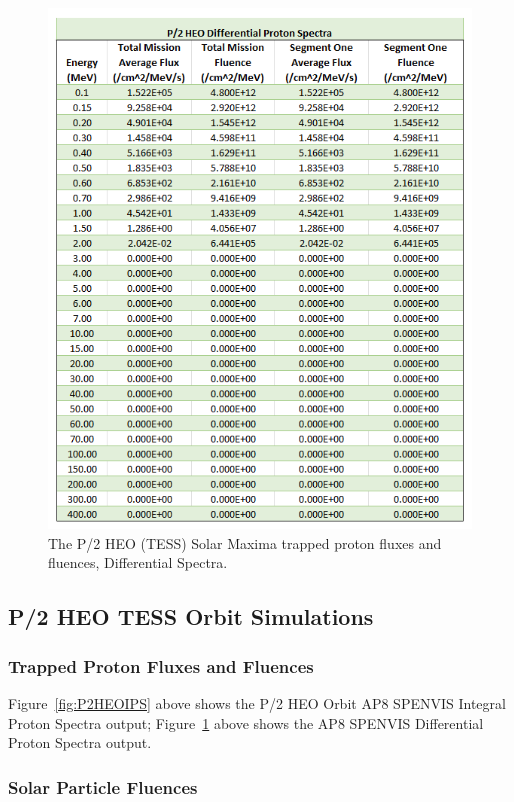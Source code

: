 \documentclass[11pt]{article}
\begin{document}
\begin{figure}[H]
\begin{minipage}{\dimexpr.5\textwidth-1em}
        \includegraphics[width=1\linewidth]{HEO_DPS.png}
        \caption{The P/2 HEO (TESS) Solar Maxima trapped proton fluxes and fluences, Differential Spectra.}
        \label{fig:P2HEODPS}
    \end{minipage}
\end{figure}

\subsection{P/2 HEO TESS Orbit Simulations}

\subsubsection{Trapped Proton Fluxes and Fluences}

Figure~\ref{fig:P2HEOIPS} above shows the P/2 HEO Orbit AP8 SPENVIS Integral Proton Spectra output; Figure~\ref{fig:P2HEODPS} above shows the AP8 SPENVIS Differential Proton Spectra output.

\subsubsection{Solar Particle Fluences}
\end{document}
